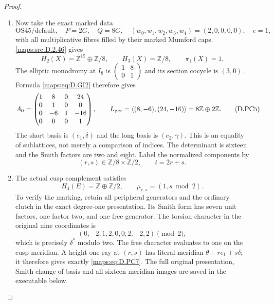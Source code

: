 \begin{proof}
\begin{enumerate}[label=\arabic*.,leftmargin=*]
\item Now take the exact marked data
\[
 \mathrm{OS45/default},\quad P=2G,\quad Q=8G,\quad
 (w_0,w_1,w_2,w_3,w_4)=(2,0,0,0,0),\quad e=1,              \tag{D.PC3}\label{maps:eq:D.PC3}
\]
with all multiplicative fibres filled by their marked Mumford caps.
\ref{maps:src:D.2.46} gives
\[
 H_2(X)=\mathbb Z^{15}\oplus\mathbb Z/8,\qquad
 H_3(X)=\mathbb Z/8,\qquad \pi_1(X)=1.
                                                               \tag{D.PC4}\label{maps:eq:D.PC4}
\]
The elliptic monodromy at $I_8$ is
$\left(\begin{smallmatrix}1&8\\0&1\end{smallmatrix}\right)$
and its section cocycle is $(3,0)$. Formula \eqref{maps:eq:D.GI2} therefore gives
\[
 A_0=\begin{pmatrix}
 1&8&0&24\\0&1&0&0\\0&-6&1&-16\\0&0&0&1
 \end{pmatrix},\qquad
 L_{\rm per}=\left\langle(8,-6),(24,-16)\right\rangle
                 =8\mathbb Z\oplus2\mathbb Z.             \tag{D.PC5}\label{maps:eq:D.PC5}
\]
The short basis is $(e_1,\delta)$ and the long basis is $(e_2,\gamma)$.
This is an equality of sublattices, not merely a comparison of
indices. The determinant is sixteen and the Smith factors are two
and eight. Label the normalized components by
\[
             (r,s)\in\mathbb Z/8\times\mathbb Z/2,
             \qquad i=2r+s.                              \tag{D.PC6}\label{maps:eq:D.PC6}
\]

\item The actual cusp complement satisfies
\[
 H_1(E)=\mathbb Z\oplus\mathbb Z/2,
                      \qquad \mu_{r,s}=(1,s\bmod2).      \tag{D.PC7}\label{maps:eq:D.PC7}
\]
To verify the marking, retain all peripheral generators and the
ordinary clutch in the exact degree-one presentation. Its Smith
form has seven unit factors, one factor two, and one free generator.
The torsion character in the original nine coordinates is
\[
                  (0,-2,1,2,0,0,2,-2,2)\pmod2,
                                                               \tag{D.PC8}\label{maps:eq:D.PC8}
\]
which is precisely $\delta^*$ modulo two. The free character
evaluates to one on the cusp meridian. A height-one ray at
$(r,s)$ has literal meridian $\theta+r e_1+s\delta$; it
therefore gives exactly \eqref{maps:eq:D.PC7}. The full original presentation,
Smith change of basis and all sixteen meridian images are saved
in the executable below.


\end{enumerate}
\end{proof}
